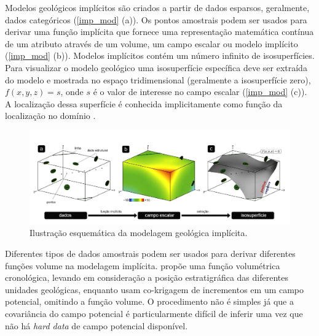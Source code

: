 Modelos geológicos implícitos são criados a partir de dados esparsos, geralmente, dados categóricos (\autoref{imp_mod} (a)). Os pontos amostrais podem ser usados para derivar uma função implícita que fornece uma representação matemática contínua de um atributo através de um volume, um campo escalar ou modelo implícito (\autoref{imp_mod} (b)). Modelos implícitos contém um número infinito de isosuperfícies. Para visualizar o modelo geológico uma isosuperfície específica deve ser extraída do modelo e mostrada no espaço tridimensional (geralmente a isosuperfície zero), $f(x,y,z)=s$, onde $s$ é o valor de interesse no campo escalar (\autoref{imp_mod} (c)). A localização dessa superfície é conhecida implicitamente como função da localização no domínio \cite{martin2017implicitmodeling}. 

\begin{figure}[H]
    \centering
	\caption{\label{imp_mod}Ilustração esquemática da modelagem geológica implícita.}
	\includegraphics[width=\textwidth]{capitulo_2/imagens/implicit_modelig_pt_1.jpg}
\end{figure}

Diferentes tipos de dados amostrais podem ser usados para derivar diferentes funções volume na modelagem implícita.  propõe uma função volumétrica cronológica, levando em consideração a posição estratigráfica das diferentes unidades geológicas, enquanto  usam co-krigagem de incrementos em um campo potencial, omitindo a função volume. O procedimento não é simples já que a covariância do campo potencial é particularmente difícil de inferir uma vez que não há \textit{hard data} de campo potencial disponível.

